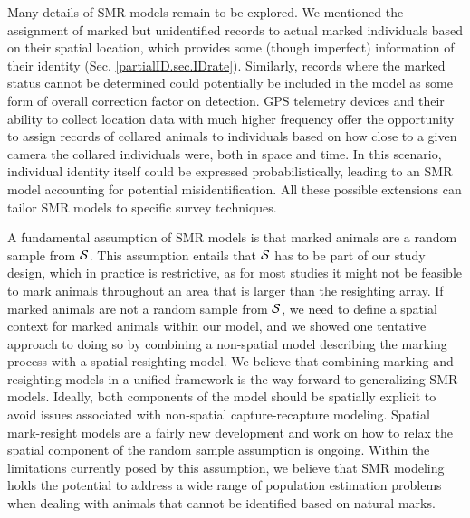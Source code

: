 Many details of SMR models remain to be explored. We mentioned the
assignment of marked but unidentified records to actual marked
individuals based on their spatial location, which provides some
(though imperfect) information of their identity
(Sec. \ref{partialID.sec.IDrate}). Similarly, records where the marked
status cannot be determined could potentially be included in the model
as some form of overall correction factor on detection. GPS telemetry
devices and their ability to collect location data with much higher
frequency offer the opportunity to assign records of collared animals
to individuals based on how close to a given camera the collared
individuals were, both in space and time. In this scenario, individual
identity itself could be expressed probabilistically, leading to an
SMR model accounting for potential misidentification. All these
possible extensions can tailor SMR models to specific survey
techniques.

A fundamental assumption of SMR models is that marked animals are a
random sample from ${\cal
  S}$. %
This assumption entails that ${\cal S}$ has to be part of our study
design, which in practice is restrictive, as for most studies it might
not be feasible to mark animals throughout an area that is larger than
the resighting array. If marked animals are not a random sample from
${\cal S}$, we need to define a spatial context for marked animals
within our model, and we showed one tentative approach to doing so by
combining a non-spatial model describing the marking process with a
spatial resighting model. We believe that combining marking and
resighting models in a unified framework is the way forward to
generalizing SMR models. Ideally, both components of the model should
be spatially explicit to avoid issues associated with non-spatial
capture-recapture modeling. Spatial mark-resight models are a fairly
new development and work on how to relax the spatial component of the
random sample assumption is ongoing. Within the limitations currently
posed by this assumption, we believe that SMR modeling holds the
potential to address a wide range of population estimation problems
when dealing with animals that cannot be identified based on natural
marks.



